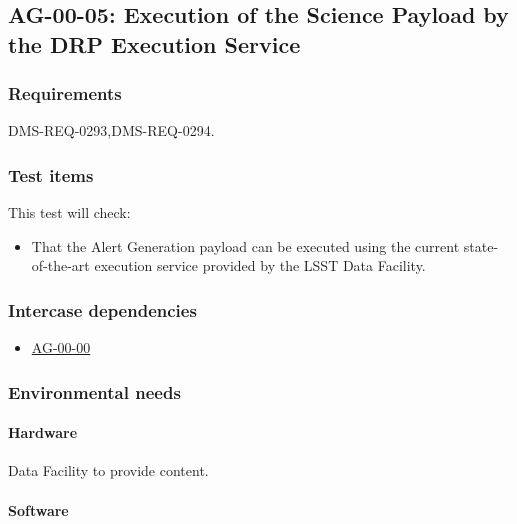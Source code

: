 \subsection{AG-00-05: Execution of the Science Payload by the DRP Execution Service}
\label{ag-00-05}

\subsubsection{Requirements}

DMS-REQ-0293,DMS-REQ-0294.

\subsubsection{Test items}

This test will check:

\begin{itemize}

  \item{That the Alert Generation payload can be executed using the current
  state-of-the-art execution service provided by the LSST Data Facility.}

\end{itemize}

\subsubsection{Intercase dependencies}

\begin{itemize}

  \item{\hyperref[ag-00-00]{AG-00-00}}

\end{itemize}

\subsubsection{Environmental needs}

\paragraph{Hardware}

\begin{note}
Data Facility to provide content.
\end{note}

\paragraph{Software}

